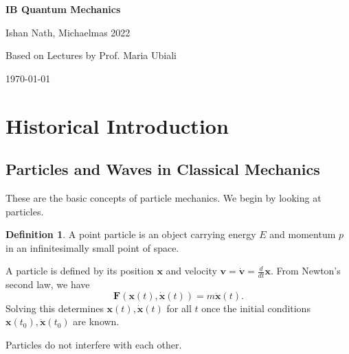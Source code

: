 \documentclass[12pt]{article}
\theoremstyle{definition}
\newtheorem{definition}{Definition}[section]
\theoremstyle{remark}
\begin{document}
\hypersetup{pageanchor=false}
\begin{titlepage}
	\begin{center}
		\vspace*{1em}
		\Huge
		\textbf{IB Quantum Mechanics}

		\vspace{1em}
		\large
		Ishan Nath, Michaelmas 2022

		\vspace{1.5em}

		\Large

		Based on Lectures by Prof. Maria Ubiali

		\vspace{1em}

		\large
		\today
	\end{center}
	
\end{titlepage}
\hypersetup{pageanchor=true}

\tableofcontents

\newpage

\section{Historical Introduction}%
\label{sec:historical_introduction}

\subsection{Particles and Waves in Classical Mechanics}%
\label{sub:particles_and_waves_in_classical_mechanics}

These are the basic concepts of particle mechanics. We begin by looking at particles.

\begin{definition}
	A point particle is an object carrying energy $E$ and momentum $p$ in an infinitesimally small point of space.
\end{definition}

A particle is defined by its position $\mathbf{x}$ and velocity $\mathbf{v} = \mathbf{\dot v} = \frac{d}{dt} \mathbf{x}$. From Newton's second law, we have
\[
	\mathbf{F}(\mathbf{x}(t), \mathbf{\dot x}(t)) = m \mathbf{\ddot x}(t)
.\]
Solving this determines $\mathbf{x}(t), \mathbf{\dot x}(t)$ for all $t$ once the initial conditions $\mathbf{x}(t_0), \mathbf{\dot x}(t_0)$ are known.

Particles do not interfere with each other.
\end{document}
